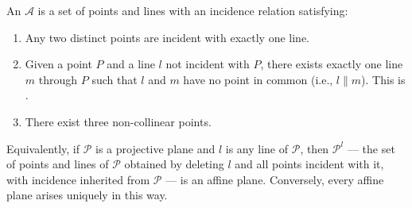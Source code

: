 An  $\mathcal{A}$ is a set of points and lines with an incidence relation satisfying:

\begin{enumerate}
\item[(i)] Any two distinct points are incident with exactly one line.
\item[(ii)] Given a point $P$ and a line $l$ not incident with $P$, there exists exactly one line $m$ through $P$ such that $l$ and $m$ have no point in common (i.e., $l \parallel m$). This is .
\item[(iii)] There exist three non-collinear points.
\end{enumerate}

Equivalently, if $\mathcal{P}$ is a projective plane and $l$ is any line of $\mathcal{P}$, then $\mathcal{P}^l$ — the set of points and lines of $\mathcal{P}$ obtained by deleting $l$ and all points incident with it, with incidence inherited from $\mathcal{P}$ — is an affine plane. Conversely, every affine plane arises uniquely in this way.
